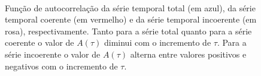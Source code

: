 \begin{figure}[ht]
\centering {}\\ 
\caption{Função de autocorrelação da série temporal total (em azul), da série temporal coerente (em vermelho) e da série temporal incoerente (em rosa), respectivamente. Tanto para a série total quanto para a série coerente o valor de $A(\tau)$ diminui com o incremento de $\tau$. Para a série incoerente o valor de $A(\tau)$ alterna entre valores positivos e negativos com o incremento de $\tau$.}
\label{figautocorrtS0681200}
\end{figure}

